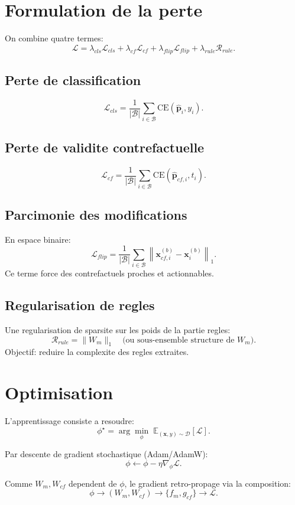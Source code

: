 \documentclass[11pt,a4paper]{article}
\begin{document}
\section{Formulation de la perte}
On combine quatre termes:
\[
\mathcal{L}
=\lambda_{cls}\mathcal{L}_{cls}
+\lambda_{cf}\mathcal{L}_{cf}
+\lambda_{flip}\mathcal{L}_{flip}
+\lambda_{rule}\mathcal{R}_{rule}.
\]

\subsection{Perte de classification}
\[
\mathcal{L}_{cls}
=\frac{1}{|\mathcal{B}|}\sum_{i\in\mathcal{B}}
\text{CE}\!\left(\hat{\bm{p}}_i,y_i\right).
\]

\subsection{Perte de validite contrefactuelle}
\[
\mathcal{L}_{cf}
=\frac{1}{|\mathcal{B}|}\sum_{i\in\mathcal{B}}
\text{CE}\!\left(\hat{\bm{p}}_{cf,i},t_i\right).
\]

\subsection{Parcimonie des modifications}
En espace binaire:
\[
\mathcal{L}_{flip}
=\frac{1}{|\mathcal{B}|}\sum_{i\in\mathcal{B}}
\left\|\bm{x}^{(b)}_{cf,i}-\bm{x}^{(b)}_i\right\|_1.
\]
Ce terme force des contrefactuels proches et actionnables.

\subsection{Regularisation de regles}
Une regularisation de sparsite sur les poids de la partie regles:
\[
\mathcal{R}_{rule}=\|W_m\|_1
\quad\text{(ou sous-ensemble structure de }W_m\text{)}.
\]
Objectif: reduire la complexite des regles extraites.

\section{Optimisation}
L'apprentissage consiste a resoudre:
\[
\phi^\star=\arg\min_{\phi}\;\mathbb{E}_{(\bm{x},y)\sim\mathcal{D}}[\mathcal{L}].
\]

Par descente de gradient stochastique (Adam/AdamW):
\[
\phi\leftarrow\phi-\eta\nabla_\phi\mathcal{L}.
\]

Comme $W_m,W_{cf}$ dependent de $\phi$, le gradient retro-propage via la composition:
\[
\phi\rightarrow(W_m,W_{cf})\rightarrow
\{f_m,g_{cf}\}\rightarrow\mathcal{L}.
\]
\end{document}
